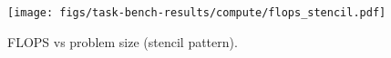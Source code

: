 \begin{figure}[t]
\centering
\texttt{[image: figs/task-bench-results/compute/flops\_stencil.pdf]}
\caption{FLOPS vs problem size (stencil pattern).\label{fig:flops}}
\end{figure}
